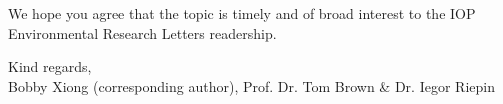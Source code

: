 \documentclass[10pt,a4paper,roman]{moderncv}        %
\begin{document}

We hope you agree that the topic is timely and of broad interest to the IOP Environmental Research Letters readership.

Kind regards,\\
Bobby Xiong (corresponding author), Prof. Dr. Tom Brown \& Dr. Iegor Riepin

\clearpage


\end{document}

